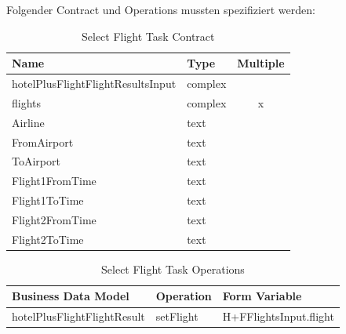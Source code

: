 Folgender Contract und Operations mussten spezifiziert werden:
\begin{table}[H] 
	\caption{Select Flight Task Contract}
	\centering
	
	\begin{tabular}{ | l | l | c | } 
		\hline
		\textbf{Name} & \textbf{Type} & \textbf{Multiple} \\ \hline 
		hotelPlusFlightFlightResultsInput & complex & \\ \hline
		\hspace*{5mm}flights & complex & x \\ \hline
		\hspace*{10mm}Airline & text & \\ \hline
		\hspace*{10mm}FromAirport & text & \\ \hline
		\hspace*{10mm}ToAirport & text & \\ \hline
		\hspace*{10mm}Flight1FromTime & text & \\ \hline
		\hspace*{10mm}Flight1ToTime & text & \\ \hline
		\hspace*{10mm}Flight2FromTime & text & \\ \hline
		\hspace*{10mm}Flight2ToTime & text & \\ \hline
	\end{tabular} 
\end{table}
\begin{table}[H] 
	\caption{Select Flight Task Operations}
	\centering
	
	\begin{tabular}{ | l | l | l | } 
		\hline
		\textbf{Business Data Model} & \textbf{Operation} & \textbf{Form Variable} \\ \hline 
		hotelPlusFlightFlightResult & setFlight & H+FFlightsInput.flight \\ \hline
	\end{tabular} 
\end{table}